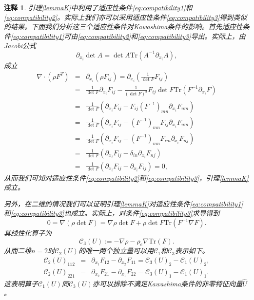 \documentclass{article}
\newtheorem{remark}{注释}
\begin{document}
\begin{remark}
引理\ref{lemmaK}中利用了适应性条件\eqref{eq:compatibility1}和\eqref{eq:compatibility2}。实际上我们亦可以采用适应性条件\eqref{eq:compatibility3}得到类似的结果。下面我们分析这三个适应性条件对Kawashima条件的影响。首先适应性条件\eqref{eq:compatibility1}可由\eqref{eq:compatibility2}和\eqref{eq:compatibility3}导出。实际上，由
Jacobi公式
$$
\partial_{x_i}\det A = \det A \mbox{Tr}(A^{-1} \partial_{x_i} A),
$$
成立
\begin{eqnarray*}
\nabla \cdot (\rho F^T)  & = &\partial_{x_i} ( \rho F_{ij}) = \partial_{x_i} ( \frac{1}{\det F} F_{ij})  \\
&=& \frac{1}{\det F} \partial_{x_i} F_{ij}  - \frac{1}{(\det F)^2} F_{ij} \det F \mbox{Tr}(F^{-1} \partial_{x_i} F) \\
&=&\frac{1}{\det F} (\partial_{x_i} F_{ij} - F_{ij} (F^{-1})_{mn} \partial_{x_i} F_{nm}) \\
&=& \frac{1}{\det F} (\partial_{x_i} F_{ij} - (F^{-1})_{mn} F_{ij} \partial_{x_i} F_{nm}) \\
&=&  \frac{1}{\det F} (\partial_{x_i} F_{ij} - (F^{-1})_{mn} F_{im} \partial_{x_i} F_{nj}) \\
&=&  \frac{1}{\det F} (\partial_{x_i} F_{ij} - \delta_{in} \partial_{x_i} F_{nj}) \\
&=&  \frac{1}{\det F} (\partial_{x_i} F_{ij} - \partial_{x_i} F_{ij}) =0 ,
\end{eqnarray*}
从而我们可知对适应性条件\eqref{eq:compatibility2}和\eqref{eq:compatibility3}，引理\ref{lemmaK}成立。

另外，在二维的情况我们可以证明引理\ref{lemmaK}对适应性条件\eqref{eq:compatibility1}和\eqref{eq:compatibility3}也成立。实际上，对条件\eqref{eq:compatibility3}求导得到
$$
0=\nabla (\rho \det F) = \nabla \rho \det F + \rho \det F \mbox{Tr}(F^{-1} \nabla F).
$$
其线性化算子为
\begin{equation*} \label{3}
\mathcal{C}_3(U):=-\nabla \rho - \rho_e \nabla \mbox{Tr}(F).
\end{equation*}
从而二维$n=2$时$\mathcal{C}_2(U)$的唯一两个独立量可以用$\mathcal{C}_1$和$\mathcal{C}_3$表示如下。
\begin{eqnarray*}
\mathcal{C}_2(U)_{112}&=&\partial_{x_1}F_{12} - \partial_{x_2}F_{11}= {\mathcal{C}_3(U)}_2 - {\mathcal{C}_1(U)}_2, \\ \mathcal{C}_2(U)_{221}&=&\partial_{x_2}F_{21}-\partial_{x_1}F_{22} = {\mathcal{C}_3(U)}_1 - {\mathcal{C}_1(U)}_1.
\end{eqnarray*}
这表明算子${\mathcal C}_1(U)$同${\mathcal C}_3(U)$亦可以排除不满足Kawashima条件的非零特征向量$\hat{U}$。


\end{remark}
\end{document}

